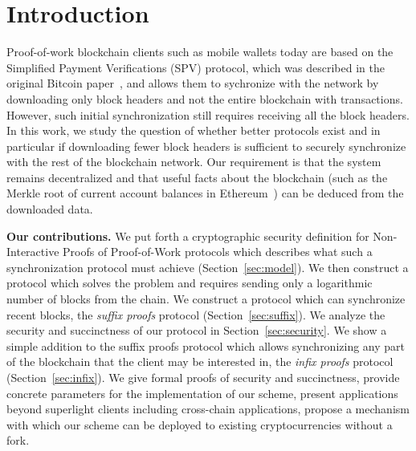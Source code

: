 \section{Introduction}

Proof-of-work blockchain clients such as mobile wallets today are based on the
Simplified Payment Verifications (SPV) protocol, which was described in the
original Bitcoin paper~\cite{bitcoin}, and allows them to sychronize with the
network by downloading only block headers and not the entire blockchain with
transactions. However, such initial synchronization still requires receiving all
the block headers. In this work, we study the question of whether better
protocols exist and in particular if downloading fewer block headers is
sufficient to securely synchronize with the rest of the blockchain network. Our
requirement is that the system remains decentralized and that useful facts about
the blockchain (such as the Merkle root of current account balances in
Ethereum~\cite{wood,buterin}) can be deduced from the downloaded data.

\noindent\textbf{Our contributions.}
We put forth a cryptographic security definition for
Non-Interactive Proofs of Proof-of-Work protocols which describes what such a
synchronization protocol must achieve (Section~\ref{sec:model}). We then
construct a protocol which solves the problem and requires sending only a
logarithmic number of blocks from the chain. We construct a protocol which can
synchronize recent blocks, the \emph{suffix proofs} protocol
(Section~\ref{sec:suffix}).
We analyze the security and succinctness of
our protocol in Section~\ref{sec:security}.
We show a simple addition to the suffix proofs protocol
which allows synchronizing any part of the blockchain that the client may be
interested in, the \emph{infix proofs} protocol (Section~\ref{sec:infix}).
We give formal proofs of security and succinctness, provide
concrete parameters for the implementation of our scheme, present applications
beyond superlight clients including cross-chain applications, propose a mechanism with which our scheme can
be deployed to existing cryptocurrencies without a fork.


%
%
%

